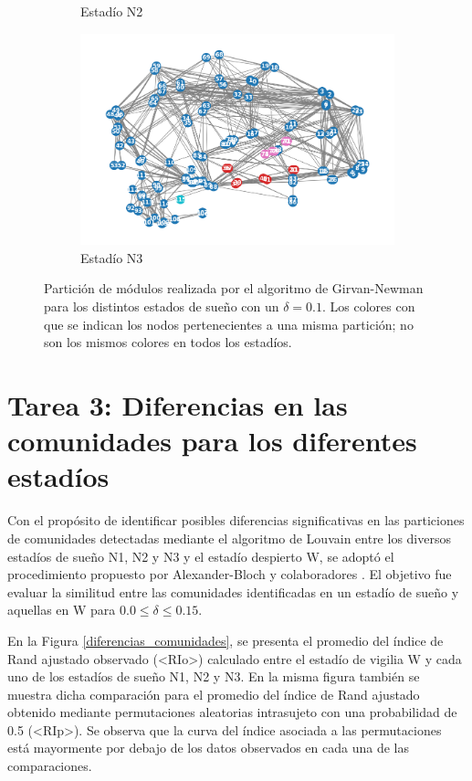 \documentclass{article}
\begin{document}
\begin{figure}[!htb]
\begin{subfigure}[b]{0.45\textwidth}
        \caption{Estadío N2}
        \label{modulos_N2_GN}
	\end{subfigure}
 	\begin{subfigure}[b]{0.45\textwidth}
		\includegraphics[width= \textwidth]{fg/modulos_N3_GN.png}
        \caption{Estadío N3}
        \label{modulos_N3_GN}
	\end{subfigure}
	\caption{Partición de módulos realizada por el algoritmo de Girvan-Newman para los distintos estados de sueño con un $\delta = 0.1$. Los colores con que se indican los nodos pertenecientes a una misma partición; no son los mismos colores en todos los estadíos.}	
    \label{fg_modulos_Girvan_Newman}
\end{figure}




\section{Tarea 3: Diferencias en las comunidades para los diferentes estadíos}

Con el propósito de identificar posibles diferencias significativas en las particiones de comunidades detectadas mediante el algoritmo de Louvain entre los diversos estadíos de sueño N1, N2 y N3 y el estadío despierto W, se adoptó el procedimiento propuesto por Alexander-Bloch y colaboradores \cite{alexander-bloch_discovery_2012}.
El objetivo fue evaluar la similitud entre las comunidades identificadas en un estadío de sueño y aquellas en W para $0.0 \leq \delta \leq 0.15$.

En la Figura \ref{diferencias_comunidades}, se presenta el promedio del índice de Rand ajustado observado (<RIo>) calculado entre el estadío de vigilia W y cada uno de los estadíos de sueño N1, N2 y N3.
En la misma figura también se muestra dicha comparación para el promedio del índice de Rand ajustado obtenido mediante permutaciones aleatorias intrasujeto con una probabilidad de 0.5 (<RIp>). %
Se observa que la curva del índice asociada a las permutaciones está mayormente por debajo de los datos observados en cada una de las comparaciones.
\end{document}
